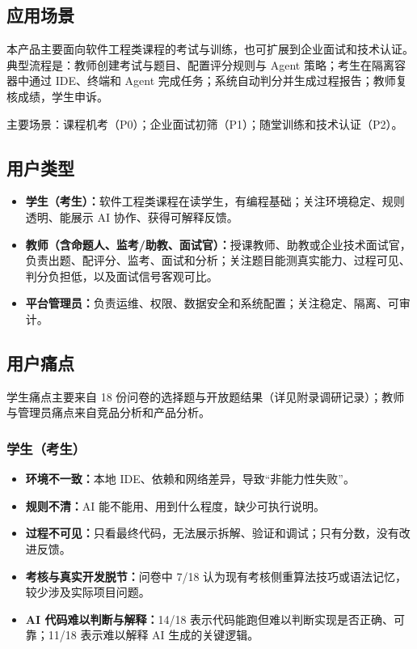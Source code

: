 \documentclass[UTF8,12pt,a4paper]{ctexart}
\begin{document}
\subsection{应用场景}

本产品主要面向软件工程类课程的考试与训练，也可扩展到企业面试和技术认证。典型流程是：教师创建考试与题目、配置评分规则与 Agent 策略；考生在隔离容器中通过 IDE、终端和 Agent 完成任务；系统自动判分并生成过程报告；教师复核成绩，学生申诉。

主要场景：课程机考（P0）；企业面试初筛（P1）；随堂训练和技术认证（P2）。

\subsection{用户类型}

\begin{itemize}[leftmargin=2em]
  \item \textbf{学生（考生）：}软件工程类课程在读学生，有编程基础；关注环境稳定、规则透明、能展示 AI 协作、获得可解释反馈。
  \item \textbf{教师（含命题人、监考/助教、面试官）：}授课教师、助教或企业技术面试官，负责出题、配评分、监考、面试和分析；关注题目能测真实能力、过程可见、判分负担低，以及面试信号客观可比。
  \item \textbf{平台管理员：}负责运维、权限、数据安全和系统配置；关注稳定、隔离、可审计。
\end{itemize}

\subsection{用户痛点}

学生痛点主要来自 18 份问卷的选择题与开放题结果（详见附录调研记录）；教师与管理员痛点来自竞品分析和产品分析。

\subsubsection{学生（考生）}

\begin{itemize}[leftmargin=2em]
  \item \textbf{环境不一致：}本地 IDE、依赖和网络差异，导致“非能力性失败”。
  \item \textbf{规则不清：}AI 能不能用、用到什么程度，缺少可执行说明。
  \item \textbf{过程不可见：}只看最终代码，无法展示拆解、验证和调试；只有分数，没有改进反馈。
  \item \textbf{考核与真实开发脱节：}问卷中 7/18 认为现有考核侧重算法技巧或语法记忆，较少涉及实际项目问题。
  \item \textbf{AI 代码难以判断与解释：}14/18 表示代码能跑但难以判断实现是否正确、可靠；11/18 表示难以解释 AI 生成的关键逻辑。
\end{itemize}
\end{document}
